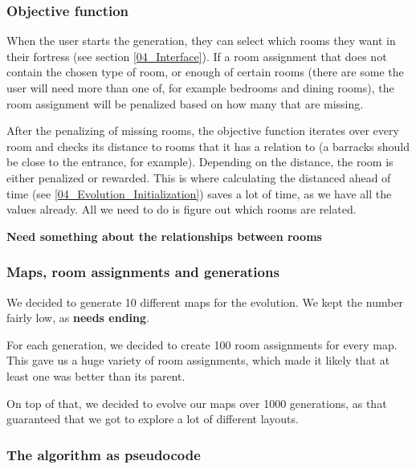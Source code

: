 \subsubsection{Objective function}

When the user starts the generation, they can select which rooms they want in their fortress (see section \ref{04_Interface}). If a room assignment that does not contain the chosen type of room, or enough of certain rooms (there are some the user will need more than one of, for example bedrooms and dining rooms), the room assignment will be penalized based on how many that are missing.

After the penalizing of missing rooms, the objective function iterates over every room and checks its distance to rooms that it has a relation to (a barracks should be close to the entrance, for example). Depending on the distance, the room is either penalized or rewarded. This is where calculating the distanced ahead of time (see \ref{04_Evolution_Initialization}) saves a lot of time, as we have all the values already. All we need to do is figure out which rooms are related.

\textbf{Need something about the relationships between rooms}

\subsubsection{Maps, room assignments and generations}

We decided to generate 10 different maps for the evolution. We kept the number fairly low, as \textbf{needs ending}.

For each generation, we decided to create 100 room assignments for every map. This gave us a huge variety of room assignments, which made it likely that at least one was better than its parent.

On top of that, we decided to evolve our maps over 1000 generations, as that guaranteed that we got to explore a lot of different layouts. 

\subsubsection{The algorithm as pseudocode}

